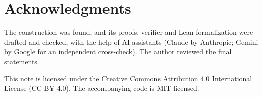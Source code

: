 \documentclass[11pt,a4paper]{article}
\theoremstyle{remark}
\begin{document}
\section*{Acknowledgments}
The construction was found, and its proofs, verifier and Lean formalization were drafted and checked, with the help of AI assistants (Claude by Anthropic; Gemini by Google for an independent cross-check). The author reviewed the final statements.



\vfill
\noindent\small This note is licensed under the Creative Commons Attribution 4.0 International License (CC BY 4.0). The accompanying code is MIT-licensed.
\end{document}
